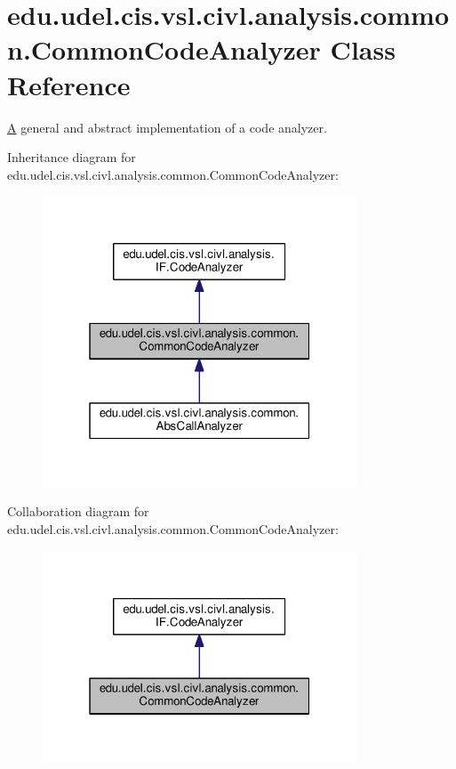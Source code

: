 \hypertarget{classedu_1_1udel_1_1cis_1_1vsl_1_1civl_1_1analysis_1_1common_1_1CommonCodeAnalyzer}{}\section{edu.\+udel.\+cis.\+vsl.\+civl.\+analysis.\+common.\+Common\+Code\+Analyzer Class Reference}
\label{classedu_1_1udel_1_1cis_1_1vsl_1_1civl_1_1analysis_1_1common_1_1CommonCodeAnalyzer}


\hyperlink{structA}{A} general and abstract implementation of a code analyzer.  




Inheritance diagram for edu.\+udel.\+cis.\+vsl.\+civl.\+analysis.\+common.\+Common\+Code\+Analyzer\+:
\nopagebreak
\begin{figure}[H]
\begin{center}
\leavevmode
\includegraphics[width=265pt]{classedu_1_1udel_1_1cis_1_1vsl_1_1civl_1_1analysis_1_1common_1_1CommonCodeAnalyzer__inherit__graph}
\end{center}
\end{figure}


Collaboration diagram for edu.\+udel.\+cis.\+vsl.\+civl.\+analysis.\+common.\+Common\+Code\+Analyzer\+:
\nopagebreak
\begin{figure}[H]
\begin{center}
\leavevmode
\includegraphics[width=265pt]{classedu_1_1udel_1_1cis_1_1vsl_1_1civl_1_1analysis_1_1common_1_1CommonCodeAnalyzer__coll__graph}
\end{center}
\end{figure}
